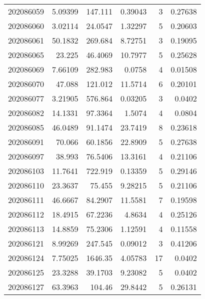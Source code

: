 \begin{tabular}{rrrrrr}
 202086059 &          5.09399 &      147.111  &            0.39043 &           3 & 0.27638 \\
 202086060 &          3.02114 &       24.0547 &            1.32297 &           5 & 0.20603 \\
 202086061 &         50.1832  &      269.684  &            8.72751 &           3 & 0.19095 \\
 202086065 &         23.225   &       46.4069 &           10.7977  &           5 & 0.25628 \\
 202086069 &          7.66109 &      282.983  &            0.0758  &           4 & 0.01508 \\
 202086070 &         47.088   &      121.012  &           11.5714  &           6 & 0.20101 \\
 202086077 &          3.21905 &      576.864  &            0.03205 &           3 & 0.0402  \\
 202086082 &         14.1331  &       97.3364 &            1.5074  &           4 & 0.0804  \\
 202086085 &         46.0489  &       91.1474 &           23.7419  &           8 & 0.23618 \\
 202086091 &         70.066   &       60.1856 &           22.8909  &           5 & 0.27638 \\
 202086097 &         38.993   &       76.5406 &           13.3161  &           4 & 0.21106 \\
 202086103 &         11.7641  &      722.919  &            0.13359 &           5 & 0.29146 \\
 202086110 &         23.3637  &       75.455  &            9.28215 &           5 & 0.21106 \\
 202086111 &         46.6667  &       84.2907 &           11.5581  &           7 & 0.19598 \\
 202086112 &         18.4915  &       67.2236 &            4.8634  &           4 & 0.25126 \\
 202086113 &         14.8859  &       75.2306 &            1.12591 &           4 & 0.11558 \\
 202086121 &          8.99269 &      247.545  &            0.09012 &           3 & 0.41206 \\
 202086124 &          7.75025 &     1646.35   &            4.05783 &          17 & 0.0402  \\
 202086125 &         23.3288  &       39.1703 &            9.23082 &           5 & 0.0402  \\
 202086127 &         63.3963  &      104.46   &           29.8442  &           5 & 0.26131 \\

\end{tabular}
